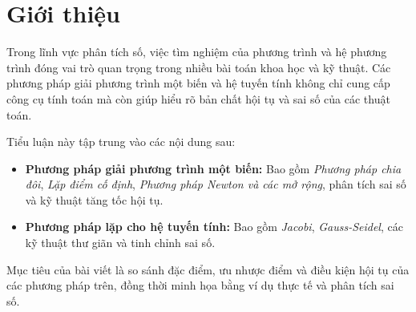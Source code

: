 \chapter*{Giới thiệu}

Trong lĩnh vực phân tích số, việc tìm nghiệm của phương trình và hệ phương trình đóng vai trò quan trọng trong nhiều bài toán khoa học và kỹ thuật. Các phương pháp giải phương trình một biến và hệ tuyến tính không chỉ cung cấp công cụ tính toán mà còn giúp hiểu rõ bản chất hội tụ và sai số của các thuật toán.

Tiểu luận này tập trung vào các nội dung sau:
\begin{itemize}
    \item \textbf{Phương pháp giải phương trình một biến:} Bao gồm \emph{Phương pháp chia đôi}, \emph{Lặp điểm cố định}, \emph{Phương pháp Newton và các mở rộng}, phân tích sai số và kỹ thuật tăng tốc hội tụ.
    \item \textbf{Phương pháp lặp cho hệ tuyến tính:} Bao gồm \emph{Jacobi}, \emph{Gauss-Seidel}, các kỹ thuật thư giãn và tinh chỉnh sai số.
\end{itemize}

Mục tiêu của bài viết là so sánh đặc điểm, ưu nhược điểm và điều kiện hội tụ của các phương pháp trên, đồng thời minh họa bằng ví dụ thực tế và phân tích sai số.
